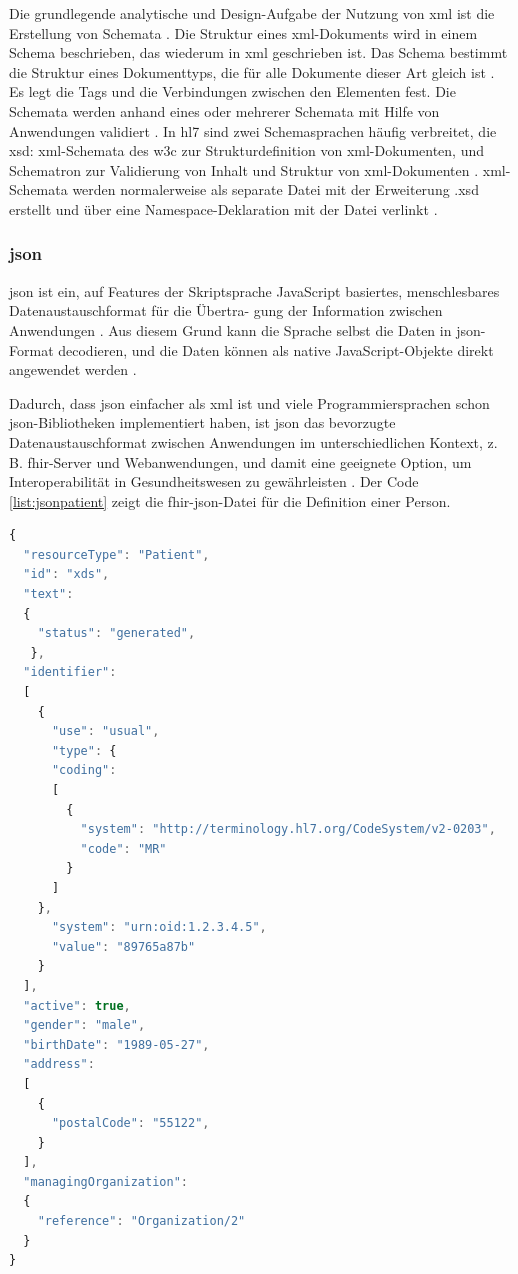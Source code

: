 Die grundlegende analytische und Design-Aufgabe der Nutzung von \ac{xml} ist die Erstellung von Schemata \cite{grundinfo}. Die Struktur eines \ac{xml}-Dokuments wird in einem Schema beschrieben, das wiederum in \ac{xml} geschrieben ist. Das Schema bestimmt die Struktur eines Dokumenttyps, die für alle Dokumente dieser Art gleich ist \cite{interop, grundinfo}. Es legt die Tags und die Verbindungen zwischen den Elementen fest. Die Schemata werden anhand eines oder mehrerer Schemata mit Hilfe von Anwendungen validiert \cite{grundinfo}. In \ac{hl7} sind zwei Schemasprachen häufig verbreitet, die \ac{xsd}: \ac{xml}-Schemata des \ac{w3c} zur Strukturdefinition von \ac{xml}-Dokumenten, und Schematron zur Validierung von Inhalt und Struktur von \ac{xml}-Dokumenten \cite{interop}. \ac{xml}-Schemata werden normalerweise als separate Datei mit der Erweiterung .xsd erstellt und über eine Namespace-Deklaration mit der Datei verlinkt \cite{interop}.

\subsubsection{\acs{json}} \label{subsubsec:json}

\acf{json} ist ein, auf Features der Skriptsprache JavaScript basiertes, menschlesbares Datenaustauschformat für die Übertra- gung der Information zwischen Anwendungen \cite{jsondef}. Aus diesem Grund kann die Sprache selbst die Daten in \ac{json}-Format decodieren, und die Daten können als native JavaScript-Objekte direkt angewendet werden \cite{interop}. 

Dadurch, dass \ac{json} einfacher als \ac{xml} ist und viele Programmiersprachen schon \ac{json}-Bibliotheken implementiert haben, ist \ac{json} das bevorzugte Datenaustauschformat zwischen Anwendungen im unterschiedlichen Kontext, z. B. \ac{fhir}-Server und Webanwendungen, und damit eine geeignete Option, um Interoperabilität in Gesundheitswesen zu gewährleisten \cite{interop, jsondef}. Der Code \ref{list:jsonpatient} zeigt die \ac{fhir}-\ac{json}-Datei für die Definition einer Person.

\begin{lstlisting}[caption={[Beispiel einer \acs{fhir}-Ressource in JSON] Beispiel einer \acs{fhir}-Ressource für eine Person in JSON.},language=JavaScript, label=list:jsonpatient, captionpos=b]
{
  "resourceType": "Patient",
  "id": "xds",
  "text": 
  {
    "status": "generated",
   },
  "identifier": 
  [
    {
      "use": "usual",
	  "type": {
	  "coding": 
	  [
	    {
	      "system": "http://terminology.hl7.org/CodeSystem/v2-0203",
	      "code": "MR"
	    }
	  ]
	},
	  "system": "urn:oid:1.2.3.4.5",
	  "value": "89765a87b"
	}
  ],
  "active": true,
  "gender": "male",
  "birthDate": "1989-05-27",
  "address": 
  [
    {	  
	  "postalCode": "55122",
	}
  ],
  "managingOrganization": 
  {
    "reference": "Organization/2"
  }
}
\end{lstlisting}

